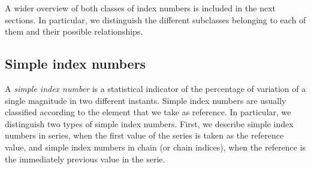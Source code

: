 




A wider overview of both classes of index numbers is included in the  next sections. In particular, we distinguish the different subclasses belonging to each of them and their possible relationships.



\subsection{Simple index numbers}\label{si}

A \emph{simple index number} is a statistical indicator of the percentage of variation of a single magnitude in two different instants. Simple index numbers are usually classified according to the element that we take as reference.  In particular, we distinguish two types of simple index numbers. First, we describe simple index numbers in series, when the first value of the series is taken as the reference value, and simple index numbers in chain (or chain indices), when the reference is the immediately previous value in the serie. 

